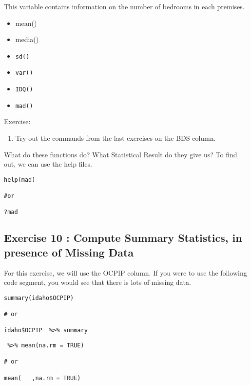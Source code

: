 \documentclass{article}
\begin{document}
This variable contains information on the number of bedrooms in each premises.


\begin{multicols}{3}
\begin{itemize}
\item mean()
\item media()
\item \texttt{sd()}
\item \texttt{var()}
\item \texttt{IDQ()}
\item \texttt{mad()}
\end{itemize}
\end{multicols}

Exercise:
\begin{enumerate}
\item Try out the commands from the last exercises on the BDS column.
\end{enumerate}

What do these functions do? What Statistical Result do they give us? To find out, we can use the help files.

\begin{framed}
\begin{verbatim}
help(mad)

#or

?mad
\end{verbatim}
\end{framed}



\subsection*{Exercise 10 : Compute Summary Statistics, in presence of Missing Data}

For this exercise, we will use the OCPIP column. If you were to use the following code segment, you would see that there is lots of missing data.
\begin{framed}
\begin{verbatim}
summary(idaho$OCPIP)

# or 

idaho$OCPIP  %>% summary
\end{verbatim}
\end{framed}

\begin{framed}
\begin{verbatim}
 %>% mean(na.rm = TRUE)

# or

mean(   ,na.rm = TRUE)
\end{verbatim}
\end{framed}
\end{document}

